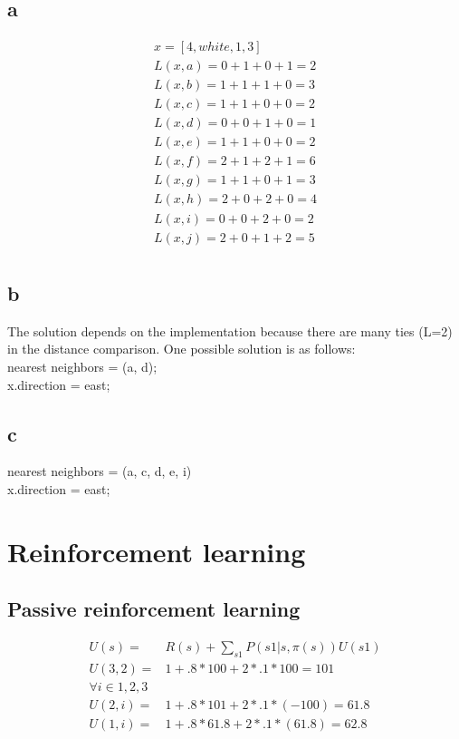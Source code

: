 \documentclass[12pt]{article}
\begin{document}
\subsection{a}
\begin{align*}
x=[4,white,1,3]\\
L(x,a) = 0+1+0+1 = 2\\
L(x,b) = 1+1+1+0 = 3\\
L(x,c) = 1+1+0+0 = 2\\
L(x,d) = 0+0+1+0 = 1\\
L(x,e) = 1+1+0+0 = 2\\
L(x,f) = 2+1+2+1 = 6\\
L(x,g) = 1+1+0+1 = 3\\
L(x,h) = 2+0+2+0 = 4\\
L(x,i) = 0+0+2+0 = 2\\
L(x,j) = 2+0+1+2 = 5\\
\end{align*}
\subsection{b}
The solution depends on the implementation because there are many ties (L=2) in the distance comparison. One possible solution is as follows:\\
nearest neighbors = (a, d);\\
x.direction = east;
\subsection{c}
nearest neighbors = (a, c, d, e, i)\\
x.direction = east;

\section{Reinforcement learning}
\subsection{Passive reinforcement learning}
\begin{align*}
  U(s) =& R(s) + \sum_{s1} P(s1|s,\pi(s)) U(s1)\\
  U(3,2) =& 1 + .8*100 + 2*.1*100 = 101\\
  \forall i \in 1, 2, 3\\
  U(2,i) =& 1 + .8*101 + 2*.1*(-100) = 61.8\\
  U(1,i) =& 1 + .8*61.8 + 2*.1*(61.8) = 62.8\\
\end{align*}
\end{document}
